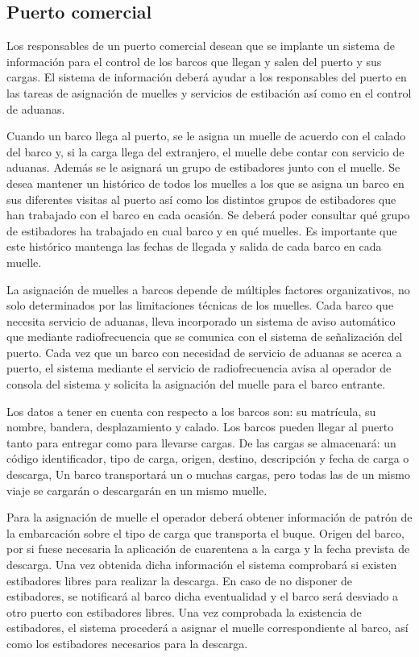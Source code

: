 \documentclass{db-practice}
\begin{document}
\subsection{Puerto comercial}

Los responsables de un puerto comercial desean que se implante un sistema de información para el control de los barcos que llegan y salen del puerto y sus cargas. El sistema de información deberá ayudar a los responsables del puerto en las tareas de asignación de muelles y servicios de estibación así como en el control de aduanas.

Cuando un barco llega al puerto, se le asigna un muelle de acuerdo con el calado del barco y, si la carga llega del extranjero, el muelle debe contar con servicio de aduanas. Además se le asignará un grupo de estibadores junto con el muelle. Se desea mantener un histórico de todos los muelles a los que se asigna un barco en sus diferentes visitas al puerto así como los distintos grupos de estibadores que han trabajado con el barco en cada ocasión. Se deberá poder consultar qué grupo de estibadores ha trabajado en cual barco y en qué muelles. Es importante que este histórico mantenga las fechas de llegada y salida de cada barco en cada muelle.

La asignación de muelles a barcos depende de múltiples factores organizativos, no solo determinados por las limitaciones técnicas de los muelles. Cada barco que necesita servicio de aduanas, lleva incorporado un sistema de aviso automático que mediante radiofrecuencia que se comunica con el sistema de señalización del puerto. Cada vez que un barco con necesidad de servicio de aduanas se acerca a puerto, el sistema mediante el servicio de radiofrecuencia avisa al operador de consola del sistema y solicita la asignación del muelle para el barco entrante.

Los datos a tener en cuenta con respecto a los barcos son: su matrícula, su nombre, bandera, desplazamiento y calado. Los barcos pueden llegar al puerto tanto para entregar como para llevarse cargas. De las cargas se almacenará: un código identificador, tipo de carga, origen, destino, descripción y fecha de carga o descarga, Un barco transportará un o muchas cargas, pero todas las de un mismo viaje se cargarán o descargarán en un mismo muelle.

Para la asignación de muelle el operador deberá obtener información de patrón de la embarcación sobre el tipo de carga que transporta el buque. Origen del barco, por si fuese necesaria la aplicación de cuarentena a la carga y la fecha prevista de descarga. Una vez obtenida dicha información el sistema comprobará si existen estibadores libres para realizar la descarga. En caso de no disponer de estibadores, se notificará al barco dicha eventualidad y el barco será desviado a otro puerto con estibadores libres. Una vez comprobada la existencia de estibadores, el sistema procederá a asignar el muelle correspondiente al barco, así como los estibadores necesarios para la descarga.
\end{document}
